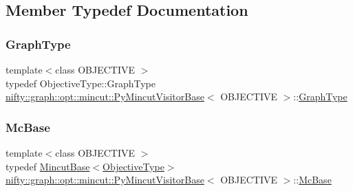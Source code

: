 \subsection{Member Typedef Documentation}
\mbox{\label{classnifty_1_1graph_1_1opt_1_1mincut_1_1PyMincutVisitorBase_a0538023e7fea2fb064c0526687a923fa}} 
\subsubsection{\texorpdfstring{Graph\+Type}{GraphType}}
{\footnotesize\ttfamily template$<$class O\+B\+J\+E\+C\+T\+I\+VE $>$ \\
typedef Objective\+Type\+::\+Graph\+Type \hyperlink{classnifty_1_1graph_1_1opt_1_1mincut_1_1PyMincutVisitorBase}{nifty\+::graph\+::opt\+::mincut\+::\+Py\+Mincut\+Visitor\+Base}$<$ O\+B\+J\+E\+C\+T\+I\+VE $>$\+::\hyperlink{classnifty_1_1graph_1_1opt_1_1mincut_1_1PyMincutVisitorBase_a0538023e7fea2fb064c0526687a923fa}{Graph\+Type}}

\mbox{\label{classnifty_1_1graph_1_1opt_1_1mincut_1_1PyMincutVisitorBase_affe563abecb7aced8bf1b0a273bf61b1}} 
\subsubsection{\texorpdfstring{Mc\+Base}{McBase}}
{\footnotesize\ttfamily template$<$class O\+B\+J\+E\+C\+T\+I\+VE $>$ \\
typedef \hyperlink{classnifty_1_1graph_1_1opt_1_1mincut_1_1MincutBase}{Mincut\+Base}$<$\hyperlink{classnifty_1_1graph_1_1opt_1_1mincut_1_1PyMincutVisitorBase_a2b620db205e661bd3dedede448cb8ca6}{Objective\+Type}$>$ \hyperlink{classnifty_1_1graph_1_1opt_1_1mincut_1_1PyMincutVisitorBase}{nifty\+::graph\+::opt\+::mincut\+::\+Py\+Mincut\+Visitor\+Base}$<$ O\+B\+J\+E\+C\+T\+I\+VE $>$\+::\hyperlink{classnifty_1_1graph_1_1opt_1_1mincut_1_1PyMincutVisitorBase_affe563abecb7aced8bf1b0a273bf61b1}{Mc\+Base}}

